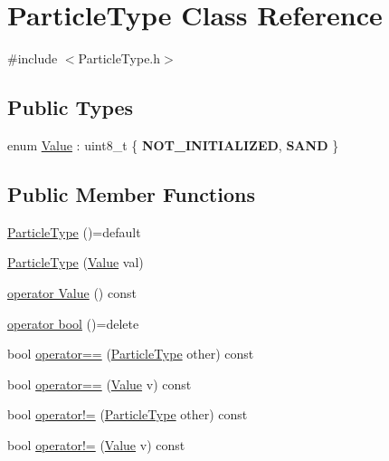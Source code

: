 \hypertarget{classParticleType}{}\section{Particle\+Type Class Reference}
\label{classParticleType}


{\ttfamily \#include $<$Particle\+Type.\+h$>$}

\subsection*{Public Types}
\begin{DoxyCompactItemize}
\item 
enum \hyperlink{classParticleType_a8b6a4b693e21bbda6c3a1181440df746}{Value} \+: uint8\+\_\+t \{ {\bfseries N\+O\+T\+\_\+\+I\+N\+I\+T\+I\+A\+L\+I\+Z\+ED}, 
{\bfseries S\+A\+ND}
 \}
\end{DoxyCompactItemize}
\subsection*{Public Member Functions}
\begin{DoxyCompactItemize}
\item 
\hyperlink{classParticleType_a7c3a02bc7a3e4baa6fd21d821e136bcb}{Particle\+Type} ()=default
\item 
\hyperlink{classParticleType_a7eda5890caabbe807a1b4e875e0343eb}{Particle\+Type} (\hyperlink{classParticleType_a8b6a4b693e21bbda6c3a1181440df746}{Value} val)
\item 
\hyperlink{classParticleType_ab7635a9010b4793e4c7dac080479830c}{operator Value} () const
\item 
\hyperlink{classParticleType_a1baf587591dfcd8ed5ba2a98b871d5da}{operator bool} ()=delete
\item 
bool \hyperlink{classParticleType_a18ed149d6ca44c5a66f4f8378d19f0a2}{operator==} (\hyperlink{classParticleType}{Particle\+Type} other) const
\item 
bool \hyperlink{classParticleType_aaa70d031bb2f66e06d0f70e022f59c07}{operator==} (\hyperlink{classParticleType_a8b6a4b693e21bbda6c3a1181440df746}{Value} v) const
\item 
bool \hyperlink{classParticleType_ad7726216d73eb6df3200503160276154}{operator!=} (\hyperlink{classParticleType}{Particle\+Type} other) const
\item 
bool \hyperlink{classParticleType_a91ad63b4f516f7e4d49ba7bc8e693ddb}{operator!=} (\hyperlink{classParticleType_a8b6a4b693e21bbda6c3a1181440df746}{Value} v) const
\end{DoxyCompactItemize}


